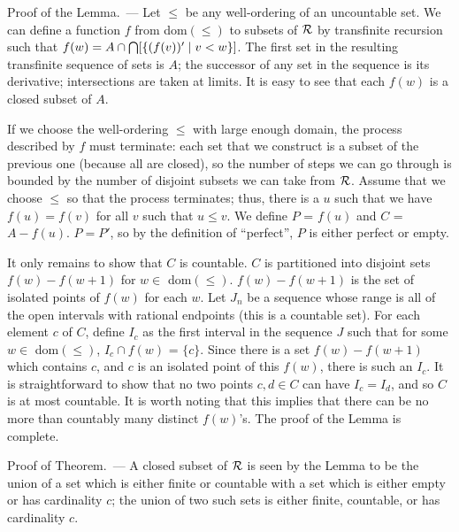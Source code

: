 {\sc Proof of the Lemma.~---} Let $\leq$ be any
well-ordering of an uncountable 
set.  We can define a function $f$ from dom$(\leq)$ to subsets
of $\cal R$ by transfinite recursion such that
$f(w) = A \cap \bigcap[\{(f(v))'\mid v < w\}]$.  The first set in the resulting 
transfinite sequence of sets is $A$; the successor
of any set in the sequence is its derivative;
intersections are taken at limits.  It is 
easy to see that each $f(w)$ is a closed subset of $A$.

If we choose the well-ordering $\leq$ with large enough
domain, the 
process described by $f$ must terminate: each set that we construct is
a subset of the previous one (because all are closed), so the number
of steps we can go through is bounded by the number of disjoint
subsets we can take from $\cal R$.  Assume that we choose $\leq$ so
that the process terminates; thus, there is a $u$ such that we have
$f(u)=f(v)$ for all $v$ such that $u \leq v$.  We define $P$ = $f(u)$
and $C$ = $A - f(u)$.  $P=P'$, so by the definition of ``perfect'',
$P$ is either perfect or empty.

It only remains to show that $C$ is countable.  $C$ is
partitioned 
into disjoint sets $f(w)-f(w+1)$ for $w \in$ dom$(\leq)$.
$f(w)-f(w+1)$ is the set of isolated points of $f(w)$ for each $w$.
Let $J_n$ be a sequence whose range is all of the open
intervals with rational endpoints (this is a countable
set).  For each element $c$ of 
$C$, define $I_c$ as the first interval in the sequence $J$ such that
for some $w \in $ dom$(\leq)$, $I_c \cap f(w)$ = $\{c\}$.  Since there
is a set $f(w)-f(w+1)$ which contains $c$, and $c$ is an
isolated point of this $f(w)$, there is such an $I_c$.  It is
straightforward to show that no two points $c,d \in C$ can have
$I_c=I_d$, and so $C$ is at most countable.  It is worth noting that
this implies that there can be no more than countably many distinct
$f(w)$'s.  The proof of the Lemma is complete.
\finpreuve

{\sc Proof of Theorem.~---} A closed subset of $\cal R$ is seen by the
Lemma to be the union of a set which is either finite or
countable with a set which is either empty or has
cardinality $c$; the union of two such sets is either
finite, countable, or has cardinality $c$.
\finpreuve


